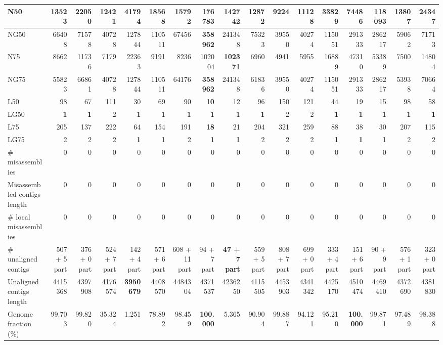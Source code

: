 \documentclass[12pt,a4paper]{article}
\begin{document}
\begin{table}[ht]
\begin{center}
\begin{tabular}{|l*{16}{|r}|}
N50 & 13523 & 22050 & 12421 & 41794 & 18568 & 15792 & {\bf 176783} & 142742 & 12872 & 9224 & 11128 & 33829 & 74486 & 118093 & 13807 & 24347 \\ \hline
NG50 & 66408 & 71578 & 40728 & 127844 & 110511 & 67456 & {\bf 358962} & 241348 & 75323 & 39550 & 40274 & 115051 & 291333 & 286217 & 59062 & 71713 \\ \hline
N75 & 8662 & 11736 & 7179 & 22363 & 9191 & 8236 & 102004 & {\bf 102371} & 6960 & 4941 & 5955 & 16889 & 47310 & 53389 & 7500 & 14804 \\ \hline
NG75 & 55823 & 66861 & 40728 & 127844 & 110511 & 64176 & {\bf 358962} & 241348 & 61836 & 39550 & 40274 & 115051 & 291333 & 286217 & 53938 & 70664 \\ \hline
L50 & 98 & 67 & 111 & 30 & 69 & 90 & {\bf 10} & 12 & 96 & 150 & 121 & 44 & 19 & 15 & 98 & 58 \\ \hline
LG50 & {\bf 1} & {\bf 1} & 2 & {\bf 1} & {\bf 1} & {\bf 1} & {\bf 1} & {\bf 1} & {\bf 1} & 2 & 2 & {\bf 1} & {\bf 1} & {\bf 1} & {\bf 1} & {\bf 1} \\ \hline
L75 & 205 & 137 & 222 & 64 & 154 & 191 & {\bf 18} & 21 & 204 & 321 & 259 & 88 & 38 & 30 & 207 & 115 \\ \hline
LG75 & 2 & 2 & 2 & {\bf 1} & {\bf 1} & 2 & {\bf 1} & {\bf 1} & 2 & 2 & 2 & {\bf 1} & {\bf 1} & {\bf 1} & 2 & 2 \\ \hline
\# misassemblies & 0 & 0 & 0 & 0 & 0 & 0 & 0 & 0 & 0 & 0 & 0 & 0 & 0 & 0 & 0 & 0 \\ \hline
Misassembled contigs length & 0 & 0 & 0 & 0 & 0 & 0 & 0 & 0 & 0 & 0 & 0 & 0 & 0 & 0 & 0 & 0 \\ \hline
\# local misassemblies & 0 & 0 & 0 & 0 & 0 & 0 & 0 & 0 & 0 & 0 & 0 & 0 & 0 & 0 & 0 & 0 \\ \hline
\# unaligned contigs & 507 + 5 part & 376 + 0 part & 524 + 7 part & 142 + 4 part & 571 + 6 part & 608 + 11 part & 94 + 7 part & {\bf 47 + 7 part} & 559 + 5 part & 808 + 7 part & 699 + 0 part & 333 + 4 part & 151 + 6 part & 90 + 9 part & 576 + 1 part & 323 + 0 part \\ \hline
Unaligned contigs length & 4415368 & 4397908 & 4176574 & {\bf 3950679} & 4408570 & 4484304 & 4371537 & 4236250 & 4115505 & 4453903 & 4341342 & 4425170 & 4510474 & 4469410 & 4372690 & 4381830 \\ \hline
Genome fraction (\%) & 99.703 & 99.820 & 35.324 & 1.251 & 78.892 & 98.459 & {\bf 100.000} & 5.365 & 90.904 & 99.887 & 94.121 & 95.210 & {\bf 100.000} & 99.871 & 97.489 & 98.388 \\ \hline

\end{tabular}
\end{center}
\end{table}
\end{document}
